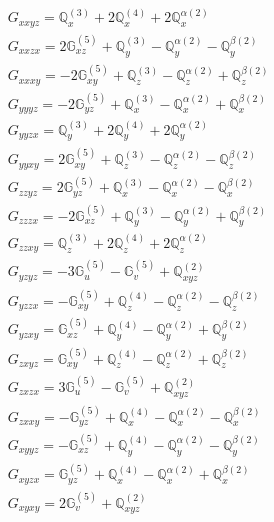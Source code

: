 \documentclass[fleqn,8pt,landscape]{jsarticle}
\begin{document}
\begin{align*}
& G_{xxyz} = \mathbb{Q}_{x}^{(3)} + 2 \mathbb{Q}_{x}^{(4)} + 2 \mathbb{Q}_{x}^{\alpha(2)} \\
& G_{xxzx} = 2 \mathbb{G}_{xz}^{(5)} + \mathbb{Q}_{y}^{(3)} - \mathbb{Q}_{y}^{\alpha(2)} - \mathbb{Q}_{y}^{\beta(2)} \\
& G_{xxxy} = - 2 \mathbb{G}_{xy}^{(5)} + \mathbb{Q}_{z}^{(3)} - \mathbb{Q}_{z}^{\alpha(2)} + \mathbb{Q}_{z}^{\beta(2)} \\
& G_{yyyz} = - 2 \mathbb{G}_{yz}^{(5)} + \mathbb{Q}_{x}^{(3)} - \mathbb{Q}_{x}^{\alpha(2)} + \mathbb{Q}_{x}^{\beta(2)} \\
& G_{yyzx} = \mathbb{Q}_{y}^{(3)} + 2 \mathbb{Q}_{y}^{(4)} + 2 \mathbb{Q}_{y}^{\alpha(2)} \\
& G_{yyxy} = 2 \mathbb{G}_{xy}^{(5)} + \mathbb{Q}_{z}^{(3)} - \mathbb{Q}_{z}^{\alpha(2)} - \mathbb{Q}_{z}^{\beta(2)} \\
& G_{zzyz} = 2 \mathbb{G}_{yz}^{(5)} + \mathbb{Q}_{x}^{(3)} - \mathbb{Q}_{x}^{\alpha(2)} - \mathbb{Q}_{x}^{\beta(2)} \\
& G_{zzzx} = - 2 \mathbb{G}_{xz}^{(5)} + \mathbb{Q}_{y}^{(3)} - \mathbb{Q}_{y}^{\alpha(2)} + \mathbb{Q}_{y}^{\beta(2)} \\
& G_{zzxy} = \mathbb{Q}_{z}^{(3)} + 2 \mathbb{Q}_{z}^{(4)} + 2 \mathbb{Q}_{z}^{\alpha(2)} \\
& G_{yzyz} = - 3 \mathbb{G}_{u}^{(5)} - \mathbb{G}_{v}^{(5)} + \mathbb{Q}_{xyz}^{(2)} \\
& G_{yzzx} = - \mathbb{G}_{xy}^{(5)} + \mathbb{Q}_{z}^{(4)} - \mathbb{Q}_{z}^{\alpha(2)} - \mathbb{Q}_{z}^{\beta(2)} \\
& G_{yzxy} = \mathbb{G}_{xz}^{(5)} + \mathbb{Q}_{y}^{(4)} - \mathbb{Q}_{y}^{\alpha(2)} + \mathbb{Q}_{y}^{\beta(2)} \\
& G_{zxyz} = \mathbb{G}_{xy}^{(5)} + \mathbb{Q}_{z}^{(4)} - \mathbb{Q}_{z}^{\alpha(2)} + \mathbb{Q}_{z}^{\beta(2)} \\
& G_{zxzx} = 3 \mathbb{G}_{u}^{(5)} - \mathbb{G}_{v}^{(5)} + \mathbb{Q}_{xyz}^{(2)} \\
& G_{zxxy} = - \mathbb{G}_{yz}^{(5)} + \mathbb{Q}_{x}^{(4)} - \mathbb{Q}_{x}^{\alpha(2)} - \mathbb{Q}_{x}^{\beta(2)} \\
& G_{xyyz} = - \mathbb{G}_{xz}^{(5)} + \mathbb{Q}_{y}^{(4)} - \mathbb{Q}_{y}^{\alpha(2)} - \mathbb{Q}_{y}^{\beta(2)} \\
& G_{xyzx} = \mathbb{G}_{yz}^{(5)} + \mathbb{Q}_{x}^{(4)} - \mathbb{Q}_{x}^{\alpha(2)} + \mathbb{Q}_{x}^{\beta(2)} \\
& G_{xyxy} = 2 \mathbb{G}_{v}^{(5)} + \mathbb{Q}_{xyz}^{(2)}
\end{align*}
\end{document}
